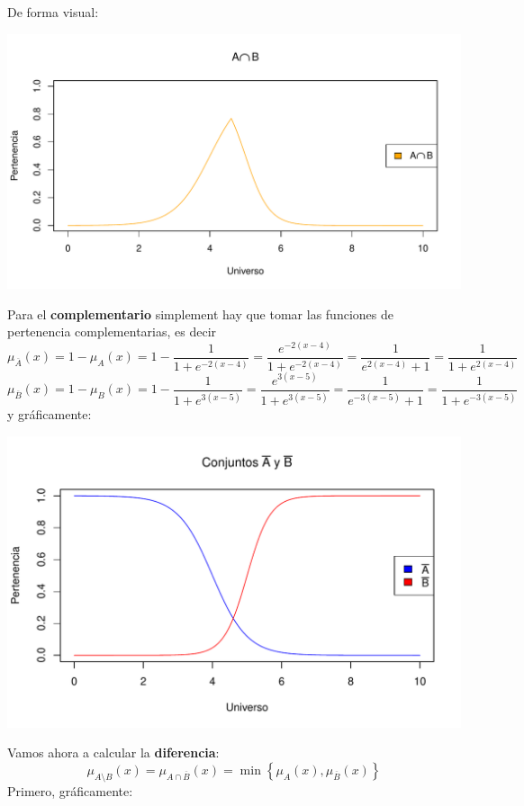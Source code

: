 \documentclass[
]{article}
\begin{document}
De forma visual:

\includegraphics{tareaBloque3_files/figure-latex/unnamed-chunk-3-1.pdf}

Para el \textbf{complementario} simplement hay que tomar las funciones
de pertenencia complementarias, es decir
\[\mu_{\overline{A}}\left(x\right)=1-\mu_{A}\left(x\right)=1-\frac{1}{1+e^{-2\left(x-4\right)}}=\frac{e^{-2\left(x-4\right)}}{1+e^{-2\left(x-4\right)}}=\frac{1}{e^{2\left(x-4\right)}+1}=\frac{1}{1+e^{2\left(x-4\right)}}\]
\[\mu_{\overline{B}}\left(x\right)=1-\mu_{B}\left(x\right)=1-\frac{1}{1+e^{3\left(x-5\right)}}=\frac{e^{3\left(x-5\right)}}{1+e^{3\left(x-5\right)}}=\frac{1}{e^{-3\left(x-5\right)}+1}=\frac{1}{1+e^{-3\left(x-5\right)}}\]
y gráficamente:

\includegraphics{tareaBloque3_files/figure-latex/unnamed-chunk-4-1.pdf}

Vamos ahora a calcular la \textbf{diferencia}:
\[\mu_{A\setminus B}\left(x\right)=\mu_{A\cap\overline{B}}\left(x\right)=\min\left\{ \mu_{A}\left(x\right),\mu_{\overline{B}}\left(x\right)\right\}\]
Primero, gráficamente:
\end{document}
